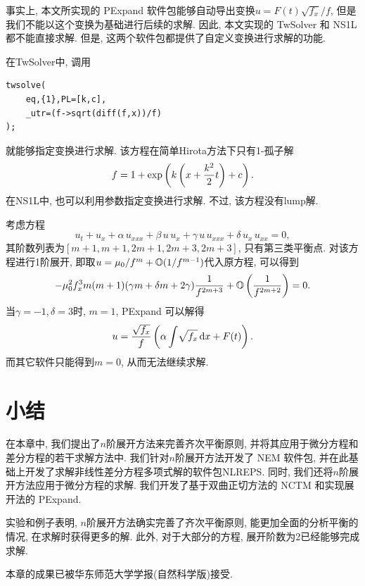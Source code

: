 事实上, 本文所实现的 PExpand 软件包能够自动导出变换$u=F(t)\sqrt{f_x}/f$, 但是我们不能以这个变换为基础进行后续的求解.  因此, 本文实现的 TwSolver 和 NS1L 都不能直接求解. 但是, 这两个软件包都提供了自定义变换进行求解的功能.

在TwSolver中, 调用
\begin{verbatim}
twsolve(
    eq,{1},PL=[k,c],
    _utr=(f->sqrt(diff(f,x))/f)
);
\end{verbatim}
就能够指定变换进行求解. 该方程在简单Hirota方法下只有1-孤子解
\begin{equation}
    f=1+\exp\left(k\left(x+\frac{k^2}{2}t\right)+c\right).
\end{equation}
在NS1L中, 也可以利用参数指定变换进行求解. 不过, 该方程没有lump解.

\begin{example} 
考虑方程 \cite{EMM}
\begin{equation}
    {{u}_{t}}+{{u}_{x}}+\alpha\,{{u}_{xxx}}+\beta\,u\,{{u}_{x}}+\gamma\,u\,{{u}_{xxx}}+\delta\,{{u}_{x}}\,{{u}_{xx}}=0,
\end{equation}
其阶数列表为$[m+1,m+1,2m+1,2m+3,2m+3]$, 只有第三类平衡点. 对该方程进行1阶展开, 即取$u=\mu_0/f^m+\mathbb O(1/f^{m-1})$代入原方程, 可以得到
\begin{equation}
    -\mu_0^2f_x^3m(m+1)(\gamma m+\delta m+2\gamma)\frac{1}{f^{2m+3}}+\mathbb O\left(\frac{1}{f^{2m+2}}\right)=0. 
\end{equation}
当$\gamma=-1,\delta=3$时, $m=1$, PExpand 可以解得 
\begin{equation}
    u=\frac{\sqrt{f_x}}{f}\left(\alpha\int\!{\sqrt{f_x}{\,\rm d}x}+F(t)\right).
\end{equation}
而其它软件只能得到$m=0$, 从而无法继续求解. 
\end{example}

\section{小结}\label{ch4sec7}

在本章中, 我们提出了$n$阶展开方法来完善齐次平衡原则, 并将其应用于微分方程和差分方程的若干求解方法中. 我们针对$n$阶展开方法开发了 NEM 软件包, 并在此基础上开发了求解非线性差分方程多项式解的软件包NLREPS. 同时, 我们还将$n$阶展开方法应用于微分方程的求解. 我们开发了基于双曲正切方法的 NCTM 和实现\Painleve{}展开法的 PExpand. 

实验和例子表明, $n$阶展开方法确实完善了齐次平衡原则, 能更加全面的分析平衡的情况, 在求解时获得更多的解. 此外, 对于大部分的方程, 展开阶数为2已经能够完成求解. 

本章的成果已被华东师范大学学报(自然科学版)接受.

